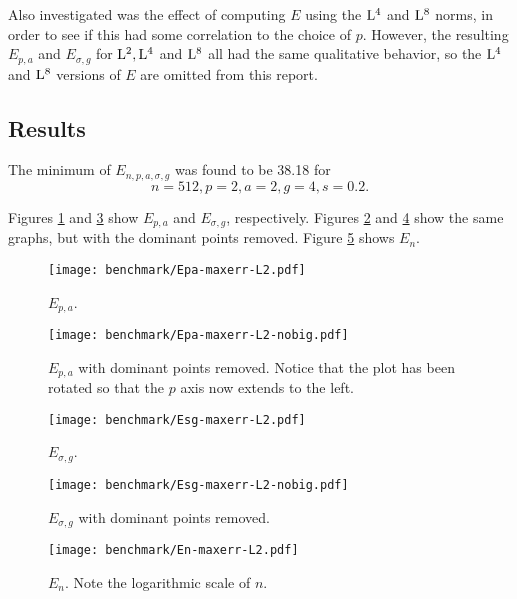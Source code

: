 Also investigated was the effect of computing $E$ using the $\Lp[4]$
and $\Lp[8]$ norms, in order to see if this had some correlation to
the choice of $p$. However, the resulting $E_{p,a}$ and $E_{\sigma,g}$ for
$\Lp[2], \Lp[4]$ and $\Lp[8]$ all had the same qualitative behavior,
so the $\Lp[4]$ and $\Lp[8]$ versions of $E$ are omitted from this
report.

\subsection{Results}

The minimum of $E_{n,p,a,\sigma,g}$ was found to be 38.18 for
\begin{equation*}
  n=512, p=2, a=2, g=4, s=0.2.
\end{equation*}

Figures \ref{fig:Epa-maxerr-L2} and \ref{fig:Esg-maxerr-L2} show
$E_{p,a}$ and $E_{\sigma,g}$, respectively. Figures
\ref{fig:Epa-maxerr-L2-nobig} and \ref{fig:Esg-maxerr-L2-nobig} show
the same graphs, but with the dominant points removed. Figure
\ref{fig:En-maxerr-L2} shows $E_n$.

\begin{figure}[p]
  \centering
  \texttt{[image: benchmark/Epa-maxerr-L2.pdf]}
  \caption{$E_{p,a}$.}
  \label{fig:Epa-maxerr-L2}
\end{figure}

\begin{figure}[p]
  \centering
  \texttt{[image: benchmark/Epa-maxerr-L2-nobig.pdf]}
  \caption{$E_{p,a}$ with dominant points removed. Notice that the
    plot has been rotated so that the $p$ axis now extends to the
    left.}
  \label{fig:Epa-maxerr-L2-nobig}
\end{figure}

\begin{figure}[p]
  \centering
  \texttt{[image: benchmark/Esg-maxerr-L2.pdf]}
  \caption{$E_{\sigma,g}$.}
  \label{fig:Esg-maxerr-L2}
\end{figure}

\begin{figure}[p]
  \centering
  \texttt{[image: benchmark/Esg-maxerr-L2-nobig.pdf]}
  \caption{$E_{\sigma,g}$ with dominant points removed.}
  \label{fig:Esg-maxerr-L2-nobig}
\end{figure}

\begin{figure}[p]
  \centering
  \texttt{[image: benchmark/En-maxerr-L2.pdf]}
  \caption{$E_n$. Note the logarithmic scale of $n$.}
  \label{fig:En-maxerr-L2}
\end{figure}


